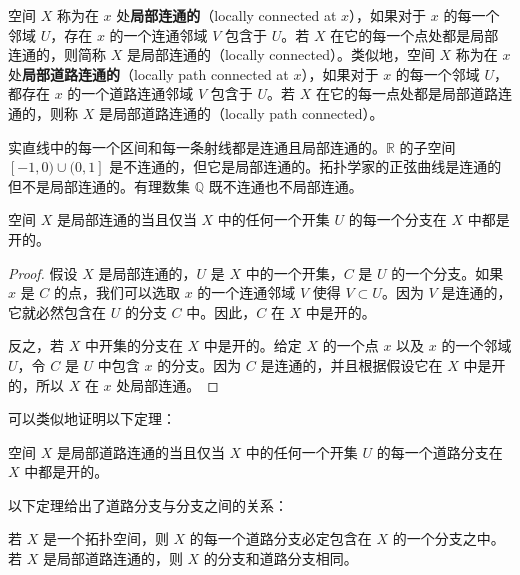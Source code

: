 \begin{definition}\label{definition:ch03-locally-connected}
空间 $X$ 称为在 $x$ 处\textbf{局部连通的}（locally connected at $x$），如果对于 $x$ 的每一个邻域 $U$，存在 $x$ 的一个连通邻域 $V$ 包含于 $U$。若 $X$ 在它的每一个点处都是局部连通的，则简称 $X$ 是局部连通的（locally connected）。类似地，空间 $X$ 称为在 $x$ 处\textbf{局部道路连通的}（locally path connected at $x$），如果对于 $x$ 的每一个邻域 $U$，都存在 $x$ 的一个道路连通邻域 $V$ 包含于 $U$。若 $X$ 在它的每一点处都是局部道路连通的，则称 $X$ 是局部道路连通的（locally path connected）。
\end{definition}

\begin{example}\label{example:ch03-locally-connected-examples}
实直线中的每一个区间和每一条射线都是连通且局部连通的。$\mathbb{R}$ 的子空间 $[-1,0)\cup(0,1]$ 是不连通的，但它是局部连通的。拓扑学家的正弦曲线是连通的但不是局部连通的。有理数集 $\mathbb{Q}$ 既不连通也不局部连通。
\end{example}

\begin{theorem}\label{theorem:ch03-locally-connected-open-components}
空间 $X$ 是局部连通的当且仅当 $X$ 中的任何一个开集 $U$ 的每一个分支在 $X$ 中都是开的。
\end{theorem}

\begin{proof}
假设 $X$ 是局部连通的，$U$ 是 $X$ 中的一个开集，$C$ 是 $U$ 的一个分支。如果 $x$ 是 $C$ 的点，我们可以选取 $x$ 的一个连通邻域 $V$ 使得 $V\subset U$。因为 $V$ 是连通的，它就必然包含在 $U$ 的分支 $C$ 中。因此，$C$ 在 $X$ 中是开的。

反之，若 $X$ 中开集的分支在 $X$ 中是开的。给定 $X$ 的一个点 $x$ 以及 $x$ 的一个邻域 $U$，令 $C$ 是 $U$ 中包含 $x$ 的分支。因为 $C$ 是连通的，并且根据假设它在 $X$ 中是开的，所以 $X$ 在 $x$ 处局部连通。
\end{proof}

可以类似地证明以下定理：

\begin{theorem}\label{theorem:ch03-locally-path-connected-open-components}
空间 $X$ 是局部道路连通的当且仅当 $X$ 中的任何一个开集 $U$ 的每一个道路分支在 $X$ 中都是开的。
\end{theorem}

以下定理给出了道路分支与分支之间的关系：

\begin{theorem}\label{theorem:ch03-path-component-in-component}
若 $X$ 是一个拓扑空间，则 $X$ 的每一个道路分支必定包含在 $X$ 的一个分支之中。若 $X$ 是局部道路连通的，则 $X$ 的分支和道路分支相同。
\end{theorem}

